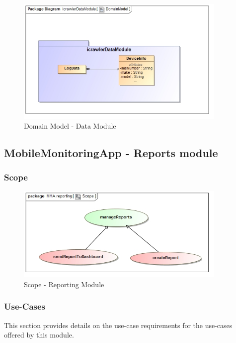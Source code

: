 \documentclass[hidelinks, 12pt, oneside]{article}
\begin{document}
		
		\begin{figure}[!htbp]
    		\centering
    		\includegraphics[width=0.9\textwidth]{img/DomainModelDataModule.jpg}
    		\caption{Domain Model - Data Module}
    		\label{fig:DomainMod_dataModule}
		\end{figure}
		\newpage
		
	\subsection{MobileMonitoringApp - Reports module}
	\subsubsection{Scope}
	
	
	\begin{figure}[!htbp]
    		\centering
    		\includegraphics[width=0.9\textwidth]{img/scopeReports.jpg}
    		\caption{Scope - Reporting Module}
    		\label{fig:Scope_reportingModule}
		\end{figure}
			
		
	\subsubsection{Use-Cases}
			This section provides details on the use-case requirements for the use-cases offered by this module.
\end{document}
